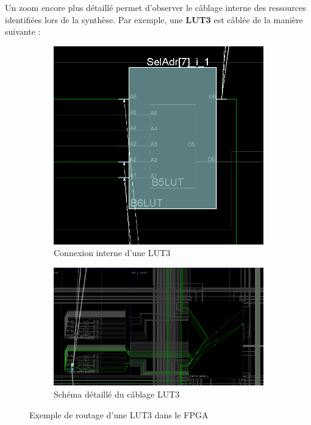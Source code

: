Un zoom encore plus détaillé permet d'observer le câblage interne des ressources identifiées lors de la synthèse.  
Par exemple, une \textbf{LUT3} est câblée de la manière suivante :  

\begin{figure}[H]
    \centering
    \begin{subfigure}[b]{0.35\linewidth}
        \centering
        \includegraphics[width=\linewidth]{images/Routage/Rou_3.png}
        \caption{Connexion interne d'une LUT3}
        \label{fig:rout_lut3a}
    \end{subfigure}
    \hfill
    \begin{subfigure}[b]{0.55\linewidth}
        \centering
        \includegraphics[width=\linewidth]{images/Routage/Rou_4.png}
        \caption{Schéma détaillé du câblage LUT3}
        \label{fig:rout_lut3b}
    \end{subfigure}
    \caption{Exemple de routage d'une LUT3 dans le FPGA}
    \label{fig:rout_lut3}
\end{figure}

